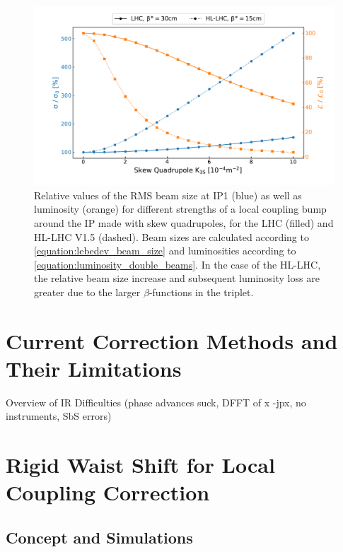 \begin{figure}[!htb]
    \centering
    \includegraphics*[width=0.99\columnwidth]{Figures/IR_Coupling_Correction/lhc_vs_hllhc_combined.pdf}
    \caption{Relative values of the RMS beam size at IP\num{1} (\textcolor{mplblue}{blue}) as well as luminosity (\textcolor{mplorange}{orange}) for different strengths of a local coupling bump around the IP made with skew quadrupoles, for the LHC (filled) and HL-LHC V1.5 (dashed). Beam sizes are calculated according to \cref{equation:lebedev_beam_size} and luminosities according to \cref{equation:luminosity_double_beams}. In the case of the HL-LHC, the relative beam size increase and subsequent luminosity loss are greater due to the larger \(\beta\)-functions in the triplet.}
    \label{fig:lhc_vs_hllhc_beam_size_and_lumi_growths}
\end{figure}


\section{Current Correction Methods and Their Limitations}

Overview of IR Difficulties (phase advances suck, DFFT of x -jpx, no instruments, SbS errors)


\section{Rigid Waist Shift for Local Coupling Correction}

\subsection{Concept and Simulations}

